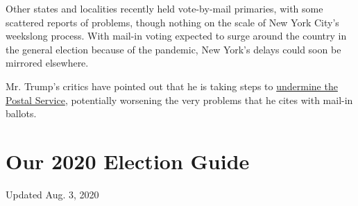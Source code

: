 Other states and localities recently held vote-by-mail primaries, with
some scattered reports of problems, though nothing on the scale of New
York City's weekslong process. With mail-in voting expected to surge
around the country in the general election because of the pandemic, New
York's delays could soon be mirrored elsewhere.

Mr. Trump's critics have pointed out that he is taking steps to
\href{https://www.nytimes.com/2020/07/31/us/politics/trump-usps-mail-delays.html}{undermine
the Postal Service}, potentially worsening the very problems that he
cites with mail-in ballots.

\hypertarget{our-2020-election-guide}{%
\section{Our 2020 Election Guide}\label{our-2020-election-guide}}

Updated Aug. 3, 2020

